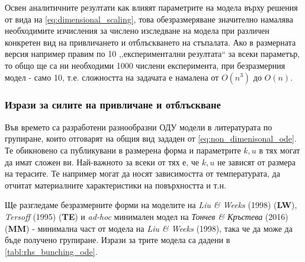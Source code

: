 Освен аналитичните резултати как влияят параметрите на модела върху решения от вида на \autoref{eq:dimensional_scaling}, това обезразмеряване значително намалява необходимите изчисления за числено изследване на модела при различен конкретен вид на привличането и отблъскването на стъпалата. Ако в размерната версия например правим по 10 ,,експериментални резултата`` за всеки параметър, то общо ще са ни необходими 1000 числени експеримента, при безразмерния модел - само 10, т.е. сложността на задачата е намалена от $O(n^3)$ до $O(n)$.

\subsubsection{Изрази за силите на привличане и отблъскване}
Във времето са разработени разнообразни ОДУ модели в литературата по групиране, които отговарят на общия вид зададен от \autoref{eq:non_dimenisonal_ode}. Те обикновено са публикувани в размерена форма и параметрите $k, u$ в тях могат да имат сложен ви. Най-важното за всеки от тях е, че $k, u$ не зависят от размера на терасите. Те например могат да носят зависимостта от температурата, да отчитат материалните характеристики на повърхността и т.н.

Ще разгледаме безразмерните форми на моделите на \textit{Liu \& Weeks} (1998) \cite{Liu1998} (\textbf{LW}), \textit{Tersoff} (1995) \cite{Tersoff1995} (\textbf{TE}) и \textit{ad-hoc} минимален модел на \textit{Тончев \& Кръстева} (2016) \cite{Krasteva2016} (\textbf{MM}) - минимална част от модела на \textit{Liu \& Weeks} (1998), така че да може да бъде получено групиране. Изрази за трите модела са дадени в \autoref{tabl:rhs_bunching_ode}.

